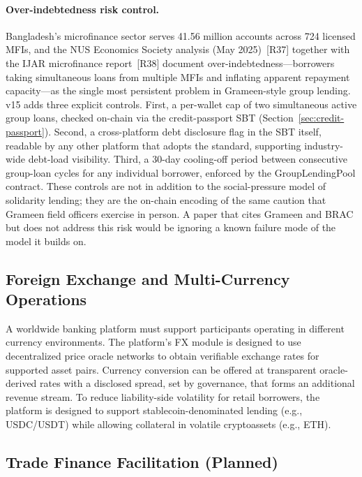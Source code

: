 \documentclass[12pt,a4paper]{report}
\begin{document}
\paragraph{Over-indebtedness risk control.}
\label{sec:over-indebt}
Bangladesh's microfinance sector serves 41.56 million accounts across 724 licensed MFIs, and the NUS Economics Society analysis (May 2025)~[R37] together with the IJAR microfinance report~[R38] document over-indebtedness---borrowers taking simultaneous loans from multiple MFIs and inflating apparent repayment capacity---as the single most persistent problem in Grameen-style group lending. v15 adds three explicit controls. First, a per-wallet cap of two simultaneous active group loans, checked on-chain via the credit-passport SBT (Section~\ref{sec:credit-passport}). Second, a cross-platform debt disclosure flag in the SBT itself, readable by any other platform that adopts the standard, supporting industry-wide debt-load visibility. Third, a 30-day cooling-off period between consecutive group-loan cycles for any individual borrower, enforced by the GroupLendingPool contract. These controls are not in addition to the social-pressure model of solidarity lending; they are the on-chain encoding of the same caution that Grameen field officers exercise in person. A paper that cites Grameen and BRAC but does not address this risk would be ignoring a known failure mode of the model it builds on.

\subsection{Foreign Exchange and Multi-Currency Operations}

A worldwide banking platform must support participants operating in different currency environments. The platform's FX module is designed to use decentralized price oracle networks to obtain verifiable exchange rates for supported asset pairs. Currency conversion can be offered at transparent oracle-derived rates with a disclosed spread, set by governance, that forms an additional revenue stream. To reduce liability-side volatility for retail borrowers, the platform is designed to support stablecoin-denominated lending (e.g., USDC/USDT) while allowing collateral in volatile cryptoassets (e.g., ETH).

\subsection{Trade Finance Facilitation (Planned)}
\end{document}
